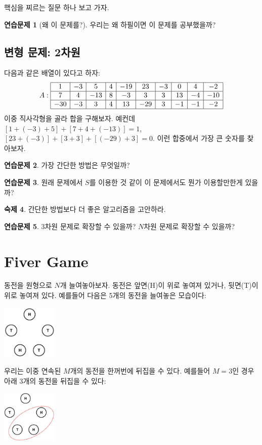 \documentclass{oblivoir}
\theoremstyle{definition}
\newtheorem{exercise}{연습문제}
\newtheorem{homework}[exercise]{숙제}
\begin{document}
핵심을 찌르는 질문 하나 보고 가자.

\begin{exercise}[왜 이 문제를?]
  우리는 왜 하필이면 이 문제를 공부했을까?
\end{exercise}

\subsection{변형 문제: 2차원}

다음과 같은 배열이 있다고 하자:
\[
A: \begin{array}{|c|c|c|c|c|c|c|c|c|c|}
\hline
1 & -3 & 5 & 4 & -19 & 23 & -3 & 0 & 4 & -2 \\
\hline
7 & 4 & -13 & 8 & -3 & 3 & 3 & 13 & -4 & -10 \\
\hline
-30 & -3 & 3 & 4 & 13 & -29 & 3 & -1 & -1 & -2 \\
\hline
\end{array}
\]
이중 직사각형을 골라 합을 구해보자.  예컨데 $[1+(-3)+5] + [7+4+(-13)]=1$,
$[23+(-3)]+[3+3]+[(-29)+3]=0$.  이런 합중에서 가장 큰 숫자를 찾아보자.

\begin{exercise}
  가장 간단한 방법은 무엇일까?
\end{exercise}

\begin{exercise}
  원래 문제에서 $S$를 이용한 것 같이 이 문제에서도 뭔가 이용할만한게
  있을까?
\end{exercise}

\begin{homework}
  간단한 방법보다 더 좋은 알고리즘을 고안하라.
\end{homework}

\begin{exercise}
  3차원 문제로 확장할 수 있을까? $N$차원 문제로 확장할 수 있을까?
\end{exercise}

\section{Fiver Game}
동전을 원형으로 $N$개 늘여놓아보자.  동전은 앞면(H)이 위로 놓여져
있거나, 뒷면(T)이 위로 놓여져 있다.  예를들어 다음은 5개의 동전을
늘여놓은 모습이다:
\begin{center}
\includegraphics[width=100px]{p1.png}
\end{center}
우리는 이중 연속된 $M$개의 동전을 한꺼번에 뒤집을 수 있다.  예를들어
$M=3$인 경우 아래 3개의 동전을 뒤집을 수 있다:
\begin{center}
\includegraphics[width=100px]{p2.png}
\end{center}
\end{document}
